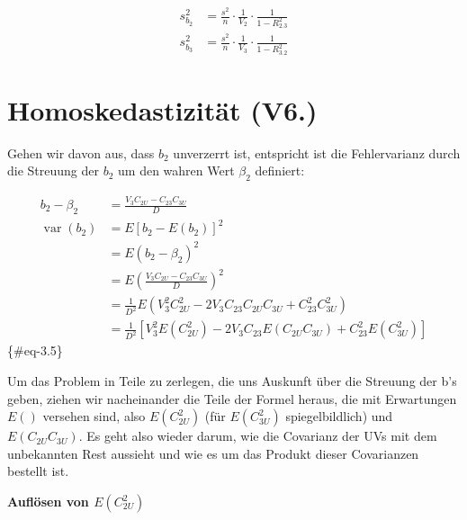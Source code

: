 \documentclass[
  10pt,
  letterpaper,
  a4paper, twoside]{scrreprt}
\begin{document}
\begin{align}
  s_{b_2}^2&=\frac{s^2}{n}\cdot\frac{1}{V_2}\cdot\frac{1}{1-R_{2.3}^2} \label{eq-sb1}\\
  s_{b_3}^2&=\frac{s^2}{n}\cdot\frac{1}{V_3}\cdot\frac{1}{1-R_{3.2}^2} \label{eq-sb2}
\end{align}

\section{Homoskedastizität (V6.)}\label{homoskedastizituxe4t-v6.}

\begin{tcolorbox}[enhanced jigsaw, coltitle=black, opacitybacktitle=0.6, toptitle=1mm, colbacktitle=quarto-callout-warning-color!10!white, colback=white, toprule=.15mm, opacityback=0, bottomrule=.15mm, arc=.35mm, colframe=quarto-callout-warning-color-frame, leftrule=.75mm, titlerule=0mm, breakable, left=2mm, rightrule=.15mm, title={IYI (∉ Klausur): Effizienz als Varianz von \(b_2\) und \(b_3\)}, bottomtitle=1mm]

Gehen wir davon aus, dass \(b_2\) unverzerrt ist, entspricht ist die
Fehlervarianz durch die Streuung der \(b_2\) um den wahren Wert
\(\beta_2\) definiert:

\begin{align}
b_2-\beta_2&=\frac{V_3 C_{2 U}-C_{23} C_{3 U}}{D} \\
\operatorname{var}\left(b_2\right)&=E\left[b_2-E\left(b_2\right)\right]^2\\
{}&=E\left(b_2-\beta_2\right)^2\\
{}&=E\left(\frac{V_3 C_{2 U}-C_{23} C_{3 U}}{D}\right)^2 \\
{}&=\frac{1}{D^2} E\left(V_3^2 C_{2 U}^2-2 V_3 C_{23} C_{2 U} C_{3 U}+C_{23}^2 C_{3 U}^2\right) \\
{}&=\frac{1}{D^2}\left[V_3^2 E\left(C_{2 U}^2\right)-2 V_3 C_{23} E\left(C_{2 U} C_{3 U}\right)+C_{23}^2 E\left(C_{3 U}^2\right)\right]
\end{align} \{\#eq-3.5\}

Um das Problem in Teile zu zerlegen, die uns Auskunft über die Streuung
der b's geben, ziehen wir nacheinander die Teile der Formel heraus, die
mit Erwartungen \(E()\) versehen sind, also \(E(C_{2U}^2)\) (für
\(E(C_{3U}^2)\) spiegelbildlich) und \(E(C_{2U} C_{3U})\). Es geht also
wieder darum, wie die Covarianz der UVs mit dem unbekannten Rest
aussieht und wie es um das Produkt dieser Covarianzen bestellt ist.

\textbf{Auflösen von \(E(C_{2U}^2)\)}


\end{tcolorbox}
\end{document}
